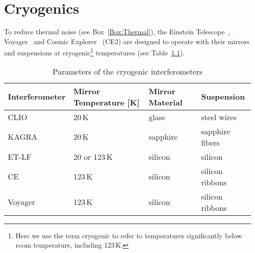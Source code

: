\chapter{Cryogenics}
\label{sec:Cryogenics}


To reduce thermal noise (see Box~\ref{Box:Thermal}), the Einstein Telescope~\cite{ET2011}, Voyager~\cite{Voyager:Inst} and Cosmic Explorer~\cite{CosmicExplorer2017} (CE2) are designed to operate with their mirrors and suspensions at cryogenic\footnote{Here we use the term cryogenic to refer to temperatures significantly below room temperature, including 123\,K.} temperatures (see Table~\ref{tab:CryoTemps}).

\begin{table}[h]
\centering
\begin{tabular}{ |l||l|l|l|  }
 \hline
 Interferometer & Mirror Temperature [K] & Mirror Material & Suspension \\
 \hline
 CLIO           &   20\,K           & glass     &  steel wires \\
 KAGRA          &   20\,K           & sapphire  &  sapphire fibers  \\
 ET-LF             &   20 or 123\,K    & silicon   &  silicon  \\
 CE             &   123\,K          & silicon   &  silicon ribbons \\
 Voyager        &   123\,K          & silicon   &  silicon ribbons \\
 \hline
\end{tabular}
\caption[Cryo IFOs]{Parameters of the cryogenic interferometers}
\label{tab:CryoTemps}
\end{table}

